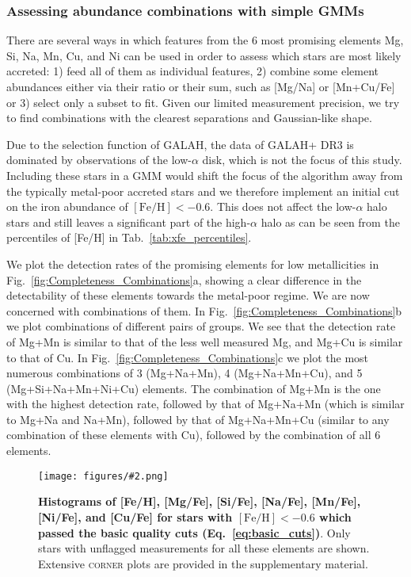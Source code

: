 \documentclass[fleqn,usenatbib]{mnras}
\newcommand{\codeicon}{{\faCloudDownload}}
\newcommand{\codelink}[1]{\href{https://github.com/svenbuder/Accreted-stars-in-GALAH-DR3/tree/main/figures/#1.ipynb}{\codeicon}\,\,}
\newcommand{\oscaption}[2]{\caption{#2 \codelink{#1}}}
\newcommand{\figuretextwidth}[4]{\begin{figure*} \centering \texttt{[image: figures/\#2.png]}\oscaption{#3}{#4}\label{fig:#2} \end{figure*}}
\begin{document}
\subsubsection{Assessing abundance combinations with simple GMMs} \label{sec:sample_gmm}

There are several ways in which features from the 6 most promising elements Mg, Si, Na, Mn, Cu, and Ni can be used in order to assess which stars are most likely accreted: 1) feed all of them as individual features, 2) combine some element abundances either via their ratio or their sum, such as [Mg/Na] or [Mn+Cu/Fe] or 3) select only a subset to fit. Given our limited measurement precision, we try to find combinations with the clearest separations and Gaussian-like shape.

Due to the selection function of GALAH, the data of GALAH+ DR3 is dominated by observations of the low-$\alpha$ disk, which is not the focus of this study. Including these stars in a GMM would shift the focus of the algorithm away from the typically metal-poor accreted stars and we therefore implement an initial cut on the iron abundance of $\mathrm{[Fe/H] < -0.6}$. This does not affect the low-$\alpha$ halo stars and still leaves a significant part of the high-$\alpha$ halo as can be seen from the percentiles of [Fe/H] in Tab.~\ref{tab:xfe_percentiles}.

We plot the detection rates of the promising elements for low metallicities in Fig.~\ref{fig:Completeness_Combinations}a, showing a clear difference in the detectability of these elements towards the metal-poor regime. We are now concerned with combinations of them. In Fig.~\ref{fig:Completeness_Combinations}b we plot combinations of different pairs of groups. We see that the detection rate of Mg+Mn is similar to that of the less well measured Mg, and Mg+Cu is similar to that of Cu. In Fig.~\ref{fig:Completeness_Combinations}c we plot the most numerous combinations of 3 (Mg+Na+Mn), 4 (Mg+Na+Mn+Cu), and 5 (Mg+Si+Na+Mn+Ni+Cu) elements. The combination of Mg+Mn is the one with the highest detection rate, followed by that of Mg+Na+Mn (which is similar to Mg+Na and Na+Mn), followed by that of Mg+Na+Mn+Cu (similar to any combination of these elements with Cu), followed by the combination of all 6 elements.

\figuretextwidth{17cm}{hist_high_separation_elements}{gaussian_mixture_models}{
\textbf{Histograms of [Fe/H], [Mg/Fe], [Si/Fe], [Na/Fe], [Mn/Fe], [Ni/Fe], and [Cu/Fe] for stars with $\mathrm{[Fe/H]} < -0.6$ which passed the basic quality cuts (Eq.~\ref{eq:basic_cuts})}.
Only stars with unflagged measurements for all these elements are shown. Extensive \textsc{corner} plots are provided in the supplementary material.
}
\end{document}
